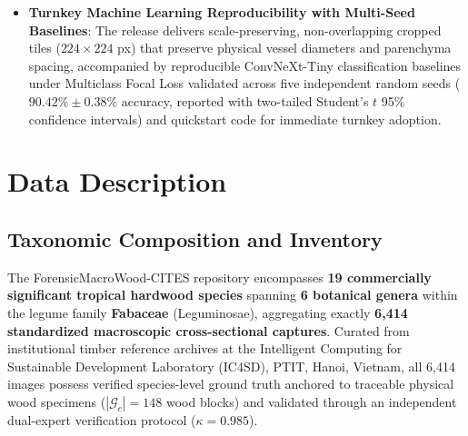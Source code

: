 \documentclass[a4paper,fleqn,12pt]{cas-sc}
\begin{document}
\begin{itemize}[leftmargin=*,itemsep=3pt,topsep=2pt]
    \item \textbf{Turnkey Machine Learning Reproducibility with Multi-Seed Baselines}: The release delivers scale-preserving, non-overlapping cropped tiles ($224 \times 224$ px) that preserve physical vessel diameters and parenchyma spacing, accompanied by reproducible ConvNeXt-Tiny classification baselines under Multiclass Focal Loss validated across five independent random seeds ($90.42\% \pm 0.38\%$ accuracy, reported with two-tailed Student's $t$ 95\% confidence intervals) and quickstart code for immediate turnkey adoption.
\end{itemize}

\section{Data Description}
\label{sec:description}

\subsection{Taxonomic Composition and Inventory}

The ForensicMacroWood-CITES repository encompasses \textbf{19 commercially significant tropical hardwood species} spanning \textbf{6 botanical genera} within the legume family \textbf{Fabaceae} (Leguminosae), aggregating exactly \textbf{6,414 standardized macroscopic cross-sectional captures}. Curated from institutional timber reference archives at the Intelligent Computing for Sustainable Development Laboratory (IC4SD), PTIT, Hanoi, Vietnam, all 6,414 images possess verified species-level ground truth anchored to traceable physical wood specimens ($|\mathcal{G}_c| = 148$ wood blocks) and validated through an independent dual-expert verification protocol ($\kappa = 0.985$).
\end{document}
